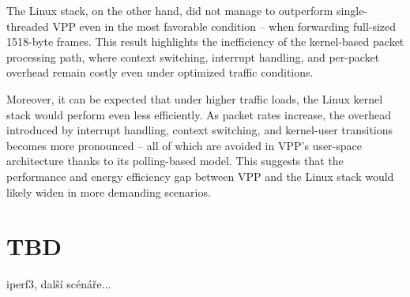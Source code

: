 The Linux stack, on the other hand, did not manage to outperform single-threaded VPP even in the most favorable condition -- when forwarding full-sized 1518-byte frames. 
This result highlights the inefficiency of the kernel-based packet processing path, where context switching, interrupt handling, and per-packet overhead remain costly even under optimized traffic conditions.

Moreover, it can be expected that under higher traffic loads, the Linux kernel stack would perform even less efficiently. 
As packet rates increase, the overhead introduced by interrupt handling, context switching, and kernel-user transitions becomes more pronounced -- all of which are avoided in VPP's user-space architecture
thanks to its polling-based model. This suggests that the performance and energy efficiency gap between VPP and the Linux stack would likely widen in more demanding scenarios.

\section{TBD}
iperf3, další scénáře...



